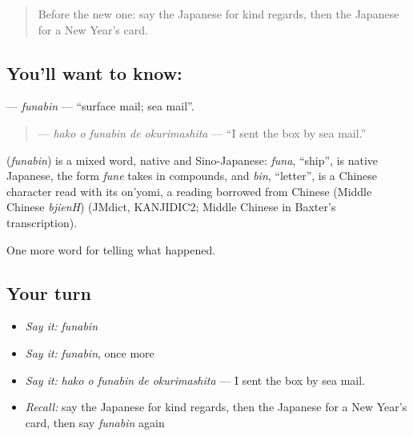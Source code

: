 \label{lesson:JA-C306-funabin}



\begin{quote}
Before the new one: say the Japanese for kind regards, then the Japanese for a New Year's card.
\end{quote}

\subsection*{You'll want to know: }
\textbf{} — \emph{funabin} — \textquotedblleft{}surface mail; sea mail\textquotedblright{}.

\begin{quote}
\textbf{  } — \emph{hako o funabin de okurimashita} — \textquotedblleft{}I sent the box by sea mail.\textquotedblright{}
\end{quote}

\begin{cousinweb}
\textbf{} (\emph{funabin}) is a mixed word, native and Sino-Japanese: \emph{funa}, \textquotedblleft{}ship\textquotedblright{}, is native Japanese, the form \emph{fune} takes in compounds, and \emph{bin}, \textquotedblleft{}letter\textquotedblright{}, is a Chinese character read with its on'yomi, a reading borrowed from Chinese (Middle Chinese \emph{bjienH}) (JMdict, KANJIDIC2; Middle Chinese in Baxter's transcription).
\end{cousinweb}

\begin{grammarlens}[title={What you've built}]
One more word for telling what happened.
\end{grammarlens}

\subsection*{Your turn}
\begin{itemize}
\raggedright
  \item \emph{Say it:} \emph{funabin}
  \item \emph{Say it:} \emph{funabin}, once more
  \item \emph{Say it:} \emph{hako o funabin de okurimashita} — I sent the box by sea mail.
  \item \emph{Recall:} say the Japanese for kind regards, then the Japanese for a New Year's card, then say \emph{funabin} again
\end{itemize}

